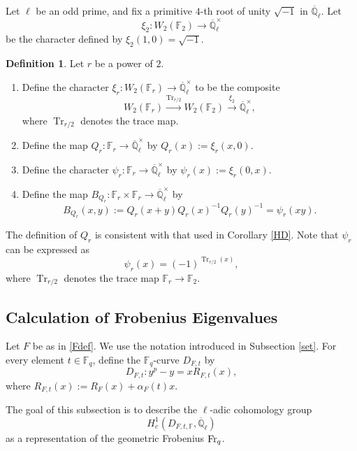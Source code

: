 \documentclass[12pt,a4paper]{amsart}
\theoremstyle{definition}
\newtheorem{definition}[theorem]{Definition}
\def\F{{\mathbb F}}
\def\Ql{\overline{\mathbb{Q}}_\ell}
\theoremstyle{remark}
\DeclareMathOperator{\Tr}{Tr}
\begin{document}
Let $\ell$ be an odd prime, and fix a primitive $4$-th root of unity $\sqrt{-1}$ in $\Ql$. Let 
\[\xi_2\colon W_2(\F_2)\to\Ql^\times\]
be the character defined by $\xi_2(1,0)=\sqrt{-1}$. 


\begin{definition}\label{Qrx}
Let  $r$ be a power of $2$. 
\begin{enumerate}
\item Define the character $\xi_r\colon W_2(\F_r)\to\Ql^\times$  to be the composite 
\[
W_2(\F_r)\xrightarrow{\Tr_{r/2}} W_2(\F_2)\xrightarrow{\xi_2}\Ql^\times, 
\]
where $\Tr_{r/2}$ denotes the trace map. 
\item Define the map $Q_r\colon \F_r\to\Ql^\times$ by $Q_r(x):=\xi_r(x,0)$. 
\item Define the character $\psi_r\colon \F_r\to \Ql^\times$ by $\psi_r(x):=\xi_r(0,x)$. 
\item Define the map $B_{Q_r}\colon \F_r\times \F_r\to \Ql^\times$ by 
\[
B_{Q_r}(x,y):=Q_r(x+y)Q_r(x)^{-1}Q_r(y)^{-1}=\psi_r(xy).
\] 
\end{enumerate}
\end{definition}
The definition of $Q_r$ is consistent with that used in Corollary \ref{HD}. 
Note that $\psi_r$ can be expressed as 
 \begin{equation*}
 \psi_r(x)=(-1)^{\Tr_{r/2}(x)}, 
 \end{equation*}
where $\Tr_{r/2}$ denotes the trace map $\F_r\to\F_2$. 



\subsection{Calculation of Frobenius Eigenvalues}
 Let $F$ be as in \eqref{Fdef}. We use the notation introduced in Subsection \ref{set}. For every element $t\in \F_q$, 
 define the $\F_q$-curve $D_{F,t}$ by 
\begin{equation}\label{Cadf}
D_{F,t}\colon y^p - y = x R_{F,t}(x), 
\end{equation}
where  $R_{F,t}(x):=R_F(x)+\alpha_F(t)x$. 

 The goal of this subsection is to describe the $\ell$-adic cohomology group 
 \[H^1_c(D_{F,t,\F},\Ql)\]
 as a representation of the geometric Frobenius ${\rm Fr}_q$. %
 
 
\end{document}
